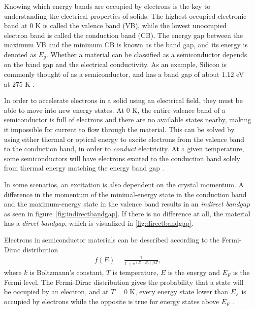 Knowing which energy bands are occupied by electrons is the key to understanding the electrical properties of solids. The highest occupied electronic band at $0$ K is called the valence band (VB), while the lowest unoccupied electron band is called the conduction band (CB). The energy gap between the maximum VB and the minimum CB is known as the band gap, and its energy is denoted as $E_g$. Whether a material can be classified as a semiconductor depends on the band gap and the electrical conductivity. As an example, Silicon is commonly thought of as a semiconductor, and has a band gap of about $1.12$ eV at $275$ K \cite{Martienssen2005}.

In order to accelerate electrons in a solid using an electrical field, they must be able to move into new energy states. At $0$ K, the entire valence band of a semiconductor is full of electrons and there are no available states nearby, making it impossible for current to flow through the material. This can be solved by using either thermal or optical energy to excite electrons from the valence band to the conduction band, in order to \textit{conduct} electricity. At a given temperature, some semiconductors will have electrons excited to the conduction band solely from thermal energy matching the energy band gap \cite{BenStreetman2015}.



In some scenarios, an excitation is also dependent on the crystal momentum.
A difference in the momentum of the minimal-energy state in the conduction band and the maximum-energy state in the valence band results in an \textit{indirect bandgap} as seen in figure \autoref{fig:indirectbandgap}. If there is no difference at all, the material has a \textit{direct bandgap}, which is visualized in \autoref{fig:directbandgap}.

Electrons in semiconductor materials can be described according to the Fermi-Dirac distribution
\begin{align*}
  f(E) = \frac{1}{1+e^{(E-E_F)/kT}},
\end{align*}
where $k$ is Boltzmann's constant, $T$ is temperature, $E$ is the energy and $E_F$ is the Fermi level. The Fermi-Dirac distribution gives the probability that a state will be occupied by an electron, and at $T=0$ K, every energy state lower than $E_F$ is occupied by electrons while the opposite is true for energy states above $E_F$ \cite{BenStreetman2015}.

